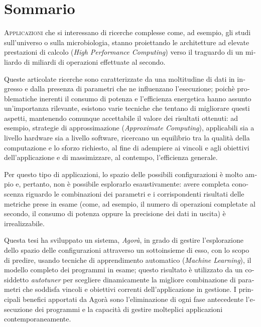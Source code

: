 \chapter*{Sommario}

\begin{otherlanguage}{italian}

\lettrine{A}{pplicazioni} che si interessano di ricerche complesse come, ad esempio, gli studi sull'universo o sulla microbiologia, stanno proiettando le architetture ad elevate prestazioni di calcolo (\textit{High Performance Computing}) verso il traguardo di un miliardo di miliardi di operazioni effettuate al secondo.

Queste articolate ricerche sono caratterizzate da una moltitudine di dati in ingresso e dalla presenza di parametri che ne influenzano l'esecuzione; poichè problematiche inerenti il consumo di potenza e l'efficienza energetica hanno assunto un'importanza rilevante, esistono varie tecniche che tentano di migliorare questi aspetti, mantenendo comunque accettabile il valore dei risultati ottenuti: ad esempio, strategie di approssimazione (\textit{Ap\-prox\-i\-mate Com\-put\-ing}), applicabili sia a livello hardware sia a livello software, ricercano un equilibrio tra la qualità della computazione e lo sforzo richiesto, al fine di adempiere ai vincoli e agli obiettivi dell'applicazione e di massimizzare, al contempo, l'efficienza generale.

Per questo tipo di applicazioni, lo spazio delle possibili configurazioni è molto ampio e, pertanto, non è possibile esplorarlo esaustivamente: avere completa conoscenza riguardo le combinazioni dei parametri e i corrispondenti risultati delle metriche prese in esame (come, ad esempio, il numero di operazioni completate al secondo, il consumo di potenza oppure la precisione dei dati in uscita) è irrealizzabile.

Questa tesi ha sviluppato un sistema, \textit{Agorà}, in grado di gestire l'esplorazione dello spazio delle configurazioni attraverso un sottoinsieme di esso, con lo scopo di predire, usando tecniche di apprendimento automatico (\textit{Machine Learning}), il modello completo dei programmi in esame; questo risultato è utilizzato da un cosiddetto \textit{autotuner} per sce\-glie\-re dinamicamente la migliore combinazione di parametri che soddisfa vincoli e obiettivi correnti dell'applicazione in gestione. I principali benefici apportati da Agorà sono l'eliminazione di ogni fase an\-te\-ce\-den\-te l'esecuzione dei programmi e la capacità di gestire molteplici applicazioni contemporaneamente.

\end{otherlanguage}
